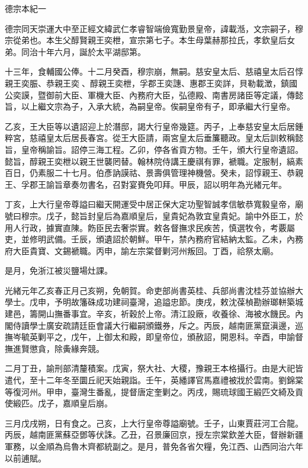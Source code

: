 
\begin{pinyinscope}
德宗本紀一

德宗同天崇運大中至正經文緯武仁孝睿智端儉寬勤景皇帝，諱載湉，文宗嗣子，穆宗從弟也。本生父醇賢親王奕枻，宣宗第七子。本生母葉赫那拉氏，孝欽皇后女弟。同治十年六月，誕於太平湖邸第。

十三年，食輔國公俸。十二月癸酉，穆宗崩，無嗣。慈安皇太后、慈禧皇太后召惇親王奕脤、恭親王奕、醇親王奕枻，孚郡王奕譓、惠郡王奕詳，貝勒載澂，鎮國公奕謨，暨御前大臣、軍機大臣、內務府大臣，弘德殿、南書房諸臣等定議，傳懿旨，以上繼文宗為子，入承大統，為嗣皇帝。俟嗣皇帝有子，即承繼大行皇帝。

乙亥，王大臣等以遺詔迎上於潛邸，謁大行皇帝幾筵。丙子，上奉慈安皇太后居鍾粹宮，慈禧皇太后居長春宮。從王大臣請，兩宮皇太后垂簾聽政。皇太后訓敕稱懿旨，皇帝稱諭旨。詔停三海工程。乙卯，停各省貢方物。壬午，頒大行皇帝遺詔。懿旨，醇親王奕枻以親王世襲罔替。翰林院侍講王慶祺有罪，褫職。定服制，縞素百日，仍素服二十七月。伯彥訥謨祜、景壽俱管理神機營。癸未，詔惇親王、恭親王、孚郡王諭旨章奏勿書名，召對宴賚免叩拜。甲辰，詔以明年為光緒元年。

丁亥，上大行皇帝尊謚曰繼天開運受中居正保大定功聖智誠孝信敏恭寬毅皇帝，廟號曰穆宗。戊子，懿旨封皇后為嘉順皇后，皇貴妃為敦宜皇貴妃。諭中外臣工，於用人行政，據實直陳。飭臣民去奢崇實。敕各督撫求民疾苦，慎選牧令，考覈屬吏，並修明武備。壬辰，頒遺詔於朝鮮。甲午，禁內務府官結納太監。乙未，內務府大臣貴寶、文錫褫職。丙申，諭左宗棠督剿河州叛回。丁酉，祫祭太廟。

是月，免浙江被災鹽場灶課。

光緒元年乙亥春正月己亥朔，免朝賀。命吏部尚書英桂、兵部尚書沈桂芬並協辦大學士。戊申，予明故籓硃成功建祠臺灣，追謚忠節。庚戌，敕沈葆楨勘辦瑯軿築城建邑，籌開山撫番事宜。辛亥，祈穀於上帝。清江設廠，收養徐、海被水饑民。內閣侍讀學士廣安疏請廷臣會議大行繼嗣頒鐵券，斥之。丙辰，越南匪黨竄滇邊，巡撫岑毓英剿平之，戊午，上御太和殿，即皇帝位，頒赦詔，開恩科。辛酉，申諭督撫進賢懲貪，除夤緣奔競。

二月丁丑，諭刑部清釐積案。戊寅，祭大社、大稷，豫親王本格攝行。由是大祀皆遣代，至十二年冬至圜丘祀天始親詣。壬午，英繙譯官馬嘉禮被戕於雲南。劉錦棠等復河州。甲申，臺灣生番亂，提督唐定奎剿之。丙戌，賜琉球國王緞匹文綺及貢使緞匹。戊子，嘉順皇后崩。

三月戊戌朔，日有食之。己亥，上大行皇帝尊謚廟號。壬子，山東賈莊河工合龍。丙辰，越南匪黨蘇亞鄧等伏誅。乙丑，召景廉回京，授左宗棠欽差大臣，督辦新疆軍務，以金順為烏魯木齊都統副之。是月，普免各省欠糧，免江西、山西同治六年以前逋賦。


\end{pinyinscope}
